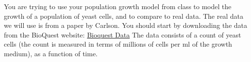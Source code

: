 \documentclass[addpoints, 11pt]{exam}
\begin{document}
\begin{questions}
\begin{parts}
\end{parts}
\question You are trying to use your population growth model from class to model the growth of a population of yeast cells, and to compare to real data. The real data we will use is from a paper by Carlson. You should start by downloading the data from the BioQuest website: \href{https://bioquest.org/numberscount/data-details/?product_id=31395}{Bioquest Data}
The data consists of a count of yeast cells (the count is measured in terms of millions of cells per ml of the growth medium), as a function of time.
\end{questions}
\end{document}
